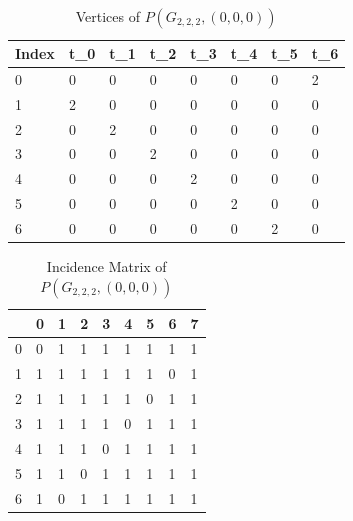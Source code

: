 \documentclass{article}
\begin{document}
\begin{table}[H]
	\centering
	\caption{Vertices of $P(G_{2,2,2}, (0,0,0))$}
	\label{G222Vert}
	\begin{tabular}{@{}llllllll@{}}
		\toprule
		Index & t\_0 & t\_1 & t\_2 & t\_3 & t\_4 & t\_5 & t\_6 \\ \midrule
		0     & 0    & 0    & 0    & 0    & 0    & 0    & 2    \\
		1     & 2    & 0    & 0    & 0    & 0    & 0    & 0    \\
		2     & 0    & 2    & 0    & 0    & 0    & 0    & 0    \\
		3     & 0    & 0    & 2    & 0    & 0    & 0    & 0    \\
		4     & 0    & 0    & 0    & 2    & 0    & 0    & 0    \\
		5     & 0    & 0    & 0    & 0    & 2    & 0    & 0    \\
		6     & 0    & 0    & 0    & 0    & 0    & 2    & 0    \\ \bottomrule
	\end{tabular}
\end{table}

\begin{table}[H]
	\centering
	\caption{Incidence Matrix of $P(G_{2,2,2}, (0,0,0))$}
	\label{G222Inc}
	\begin{tabular}{@{}lllllllll@{}}
		\toprule
		& 0 & 1 & 2 & 3 & 4 & 5 & 6 & 7 \\ \midrule
		0 & 0 & 1 & 1 & 1 & 1 & 1 & 1 & 1 \\
		1 & 1 & 1 & 1 & 1 & 1 & 1 & 0 & 1 \\
		2 & 1 & 1 & 1 & 1 & 1 & 0 & 1 & 1 \\
		3 & 1 & 1 & 1 & 1 & 0 & 1 & 1 & 1 \\
		4 & 1 & 1 & 1 & 0 & 1 & 1 & 1 & 1 \\
		5 & 1 & 1 & 0 & 1 & 1 & 1 & 1 & 1 \\
		6 & 1 & 0 & 1 & 1 & 1 & 1 & 1 & 1 \\ \bottomrule
	\end{tabular}
\end{table}
\end{document}
